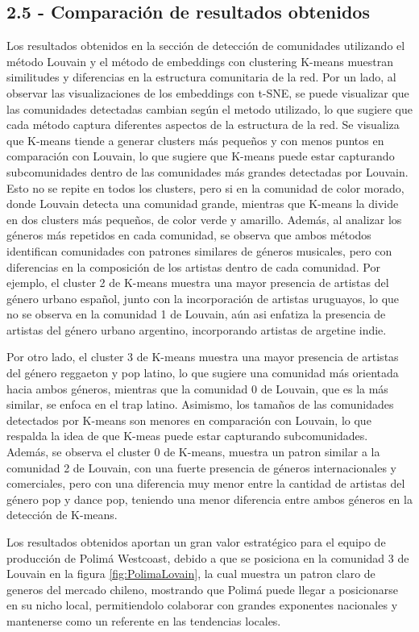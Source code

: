 \documentclass[
	spanish, %
	letterpaper, oneside
]{article}
\begin{document}
\subsection{2.5 - Comparación de resultados obtenidos}
Los resultados obtenidos en la sección de detección de comunidades utilizando el método Louvain y el método de embeddings con clustering K-means muestran similitudes y diferencias en la estructura comunitaria de la red. Por un lado, al observar las visualizaciones de los embeddings con t-SNE, se puede visualizar que las comunidades detectadas cambian según el metodo utilizado, lo que sugiere que cada método captura diferentes aspectos de la estructura de la red. Se visualiza que K-means tiende a generar clusters más pequeños y con menos puntos en comparación con Louvain, lo que sugiere que K-means puede estar capturando subcomunidades dentro de las comunidades más grandes detectadas por Louvain. Esto no se repite en todos los clusters, pero si en la comunidad de color morado, donde Louvain detecta una comunidad grande, mientras que K-means la divide en dos clusters más pequeños, de color verde y amarillo. Además, al analizar los géneros más repetidos en cada comunidad, se observa que ambos métodos identifican comunidades con patrones similares de géneros musicales, pero con diferencias en la composición de los artistas dentro de cada comunidad. Por ejemplo, el cluster 2 de K-means muestra una mayor presencia de artistas del género urbano español, junto con la incorporación de artistas uruguayos, lo que no se observa en la comunidad 1 de Louvain, aún asi enfatiza la presencia de artistas del género urbano argentino, incorporando artistas de argetine indie. 

Por otro lado, el cluster 3 de K-means muestra una mayor presencia de artistas del género reggaeton y pop latino, lo que sugiere una comunidad más orientada hacia ambos géneros, mientras que la comunidad 0 de Louvain, que es la más similar, se enfoca en el trap latino. Asimismo, los tamaños de las comunidades detectados por K-means son menores en comparación con Louvain, lo que respalda la idea de que K-meas puede estar capturando subcomunidades. Además, se observa el cluster 0 de K-means, muestra un patron similar a la comunidad 2 de Louvain, con una fuerte presencia de géneros internacionales y comerciales, pero con una diferencia muy menor entre la cantidad de artistas del género pop y dance pop, teniendo una menor diferencia entre ambos géneros en la detección de K-means. 


Los resultados obtenidos aportan un gran valor estratégico para el equipo de producción de Polimá Westcoast, debido a que se posiciona en la comunidad 3 de Louvain en la figura \ref{fig:PolimaLovain}, la cual muestra un patron claro de generos del mercado chileno, mostrando que Polimá puede llegar a posicionarse en su nicho local, permitiendolo colaborar con grandes exponentes nacionales y mantenerse como un referente en las tendencias locales. 
\end{document}
